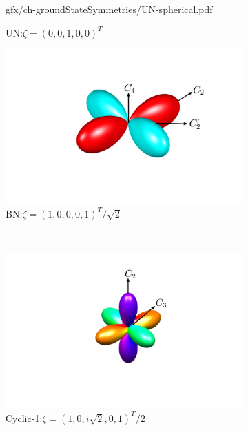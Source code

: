 \begin{figure}
\begin{subfigure}{0.49\textwidth}
        {gfx/ch-groundStateSymmetries/UN-spherical.pdf}
        \caption{\label{subfig: UN-spherical}
        UN:\@ \(\zeta={(0, 0, 1, 0, 0)}^T\)}
    \end{subfigure}
    \begin{subfigure}{0.49\textwidth}
        \includegraphics[width=\textwidth]
        {gfx/ch-groundStateSymmetries/BN-spherical.pdf}
        \caption{\label{subfig: BN-spherical}
        BN:\@ \(\zeta={(1, 0, 0, 0, 1)}^T/\sqrt{2}\)}
    \end{subfigure}\\
    \begin{subfigure}{0.49\textwidth}
        \includegraphics[width=\textwidth]
        {gfx/ch-groundStateSymmetries/C1-spherical.pdf}
        \caption{\label{subfig: C-1-spherical}
        Cyclic-1:\@ \(\zeta={(1, 0, i\sqrt{2}, 0, 1)}^T/2\)}
    \end{subfigure}
    \begin{subfigure}{0.49\textwidth}

\end{subfigure}
\end{figure}
